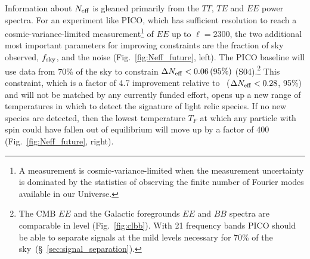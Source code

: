 \documentclass[PICOReport.tex]{subfiles}
\begin{document}
Information about ${N_{\rm eff}}$ is gleaned primarily from the $TT,\, TE$ and $EE$ power spectra. For an experiment like PICO, which has sufficient resolution to reach a cosmic-variance-limited measurement\footnote{A measurement is cosmic-variance-limited when the measurement uncertainty is dominated by the statistics of observing the finite number of Fourier modes available in our Universe.} of $EE$ up to $\ell =2300$, the two additional most important parameters for improving constraints are the fraction of sky observed, $f_{\rm sky}$, and the noise (Fig.~\ref{fig:Neff_future}, left). The PICO baseline will use data from 70\% of the sky to constrain $\Delta {N_{\rm eff}} < 0.06 \, (95\%)$ (S04).\footnote{The CMB $EE$ and the Galactic foregrounds $EE$ and $BB$ spectra are comparable in level (Fig.~\ref{fig:clbb}). With 21 frequency bands PICO should be able to separate signals at the mild levels necessary for 70\% of the sky~(\S~\ref{sec:signal_separation}).} This constraint, which is a factor of 4.7 improvement relative to \planck~($\Delta {N_{\rm eff}} < 0.28$, 95\%) and will not be matched by any currently funded effort, opens up a new range of temperatures in which to detect the signature of light relic species. If no new species are detected, then the lowest temperature $T_{F}$ at which any particle with spin could have fallen out of equilibrium will move up by a factor of 400 (Fig.~\ref{fig:Neff_future}, right). 
\end{document}
